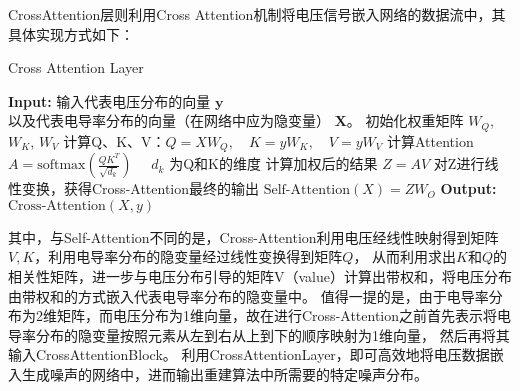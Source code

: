 CrossAttention层则利用Cross Attention机制将电压信号嵌入网络的数据流中，其具体实现方式如下：

\begin{algorithm}[H]
    
    \caption{Cross Attention Layer}
    \begin{algorithmic}[1]
        \State \textbf{Input:} 输入代表电压分布的向量 $\boldsymbol{y}$\\
        以及代表电导率分布的向量（在网络中应为隐变量） $\boldsymbol{X}$。
        \State 初始化权重矩阵 $W_Q$, $W_K$, $W_V$
        \State 计算Q、K、V：$Q = XW_Q, \quad K = yW_K, \quad V = yW_V$
        \State 计算Attention  $A = \text{softmax}\left(\frac{QK^T}{\sqrt{d_k}}\right) \quad $ $d_k$ 为Q和K的维度 
        \State 计算加权后的结果 $Z = AV$
        \State 对Z进行线性变换，获得Cross-Attention最终的输出  $\text{Self-Attention}(X) = ZW_O$
        \State \textbf{Output:} $\text{Cross-Attention}(X, y)$
    \end{algorithmic}
    \label{algorithm:CrossAttention}
\end{algorithm}

其中，与Self-Attention不同的是，Cross-Attention利用电压经线性映射得到矩阵$V, K$，利用电导率分布的隐变量经过线性变换得到矩阵$Q$，
从而利用求出$K$和$Q$的相关性矩阵，进一步与电压分布引导的矩阵V（value）计算出带权和，将电压分布由带权和的方式嵌入代表电导率分布的隐变量中。
值得一提的是，由于电导率分布为2维矩阵，而电压分布为1维向量，故在进行Cross-Attention之前首先表示将电导率分布的隐变量按照元素从左到右从上到下的顺序映射为1维向量，
然后再将其输入CrossAttentionBlock。
利用CrossAttentionLayer，即可高效地将电压数据嵌入生成噪声的网络中，进而输出重建算法中所需要的特定噪声分布。



